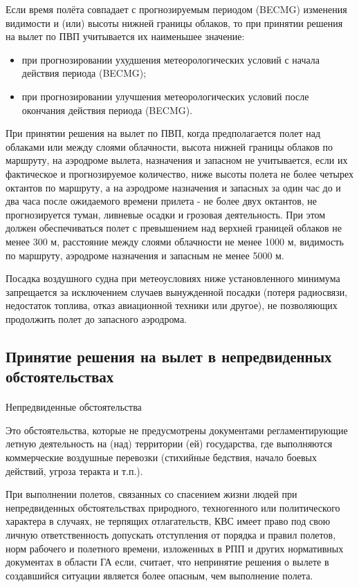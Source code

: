 Если время полёта совпадает с прогнозируемым периодом (BECMG) изменения видимости и (или) высоты нижней границы облаков, то при принятии решения на вылет по ПВП учитывается их наименьшее значение:
\begin{itemize}
    \item при прогнозировании ухудшения метеорологических условий с начала действия периода (BECMG);
    \item при прогнозировании улучшения метеорологических условий после окончания действия периода (BECMG).
\end{itemize}

При принятии решения на вылет по ПВП, когда предполагается полет над облаками или между слоями облачности, высота нижней границы облаков по маршруту, на аэродроме вылета, назначения и запасном не учитывается, если их фактическое и прогнозируемое количество, ниже высоты полета не более четырех октантов по маршруту, а на аэродроме назначения и запасных за один час до и два часа после ожидаемого времени прилета - не более двух октантов, не прогнозируется туман, ливневые осадки и грозовая деятельность. При этом должен обеспечиваться полет с превышением над верхней границей облаков не менее 300 м, расстояние между слоями облачности не менее 1000 м, видимость по маршруту, аэродроме назначения и запасным не менее 5000 м.

Посадка воздушного судна при метеоусловиях ниже установленного минимума запрещается за исключением случаев вынужденной посадки (потеря радиосвязи, недостаток топлива, отказ авиационной техники или другое), не позволяющих продолжить полет до запасного аэродрома.

\subsection{Принятие решения на вылет в непредвиденных обстоятельствах }

\paragraph{} Непредвиденные обстоятельства 

Это обстоятельства, которые не предусмотрены документами регламентирующие летную деятельность на (над) территории (ей) государства, где выполняются коммерческие воздушные перевозки (стихийные бедствия, начало боевых действий, угроза теракта и т.п.).

При выполнении полетов, связанных со спасением жизни людей при непредвиденных обстоятельствах природного, техногенного или политического характера в случаях, не терпящих отлагательств, КВС имеет право под свою личную ответственность допускать отступления от порядка и правил полетов, норм рабочего и полетного времени, изложенных в РПП и других нормативных документах в области ГА если, считает, что непринятие решения о вылете в создавшийся ситуации является более опасным, чем выполнение полета.

